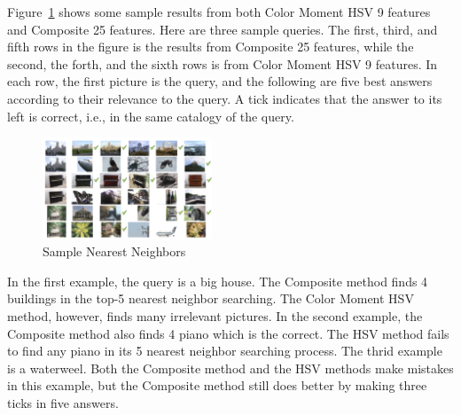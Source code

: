 \documentclass{acm_proc_article-sp}
\begin{document}
Figure~\ref{fig:result} shows some sample results from both
    Color Moment HSV 9 features and
    Composite 25 features.
Here are three sample queries.
The first, third, and fifth rows in the figure
    is the results from Composite 25 features,
    while the second, the forth, and the sixth
    rows is from Color Moment HSV 9 features.
In each row, the first picture is the query,
    and the following are five best answers according to
    their relevance to the query.
A tick indicates that the answer to its left is correct,
    i.e., in the same catalogy of the query.
\begin{figure} \centering
    \includegraphics[width=0.45\textwidth]{data/result.png}
    \caption{Sample Nearest Neighbors}
    \label{fig:result}
\end{figure}

In the first example, the query is a big house.
The Composite method finds 4 buildings in the top-5 nearest neighbor searching.
The Color Moment HSV method, however, finds many
    irrelevant pictures.
In the second example, the Composite method
    also finds 4 piano which is the correct.
The HSV method fails to find any piano in its
    5 nearest neighbor searching process.
The thrid example is a waterweel.
Both the Composite method and the HSV methods make mistakes
    in this example,
    but the Composite method still does better
    by making three ticks in five answers.


 

\balancecolumns
\end{document}
